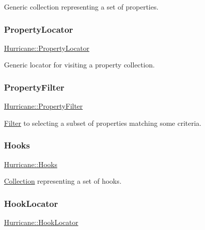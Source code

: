 Generic collection representing a set of properties. \mbox{\label{namespaceHurricane_a91d71616b5784225dfd4296487e49c07}} 
\subsubsection{\texorpdfstring{Property\+Locator}{PropertyLocator}}
{\footnotesize\ttfamily \hyperlink{namespaceHurricane_a91d71616b5784225dfd4296487e49c07}{Hurricane\+::\+Property\+Locator}}

Generic locator for visiting a property collection. \mbox{\label{namespaceHurricane_a9e98e66d188d506145a5e92045691777}} 
\subsubsection{\texorpdfstring{Property\+Filter}{PropertyFilter}}
{\footnotesize\ttfamily \hyperlink{namespaceHurricane_a9e98e66d188d506145a5e92045691777}{Hurricane\+::\+Property\+Filter}}

\hyperlink{classHurricane_1_1Filter}{Filter} to selecting a subset of properties matching some criteria. \mbox{\label{namespaceHurricane_a9dcd9b74dc5e2b51bec7a13c25807e02}} 
\subsubsection{\texorpdfstring{Hooks}{Hooks}}
{\footnotesize\ttfamily \hyperlink{namespaceHurricane_a9dcd9b74dc5e2b51bec7a13c25807e02}{Hurricane\+::\+Hooks}}

\hyperlink{classHurricane_1_1Collection}{Collection} representing a set of hooks. \mbox{\label{namespaceHurricane_aca3a5babe6265eb9f140112d8e8b79e6}} 
\subsubsection{\texorpdfstring{Hook\+Locator}{HookLocator}}
{\footnotesize\ttfamily \hyperlink{namespaceHurricane_aca3a5babe6265eb9f140112d8e8b79e6}{Hurricane\+::\+Hook\+Locator}}

